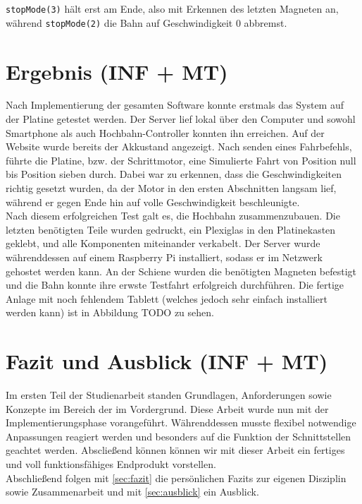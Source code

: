 \texttt{stopMode(3)} hält erst am Ende, also mit Erkennen des letzten Magneten an, während \texttt{stopMode(2)} die Bahn auf Geschwindigkeit 0 abbremst.

\chapter{Ergebnis (INF + MT)}
Nach Implementierung der gesamten Software konnte erstmals das System auf der Platine getestet werden. Der Server lief lokal über den Computer und sowohl Smartphone als auch Hochbahn-Controller konnten ihn erreichen. Auf der Website wurde bereits der Akkustand angezeigt. Nach senden eines Fahrbefehls, führte die Platine, bzw. der Schrittmotor, eine Simulierte Fahrt von Position null bis Position sieben durch. Dabei war zu erkennen, dass die Geschwindigkeiten richtig gesetzt wurden, da der Motor in den ersten Abschnitten langsam lief, während er gegen Ende hin auf volle Geschwindigkeit beschleunigte. \\
Nach diesem erfolgreichen Test galt es, die Hochbahn zusammenzubauen. Die letzten benötigten Teile wurden gedruckt, ein Plexiglas in den Platinekasten geklebt, und alle Komponenten miteinander verkabelt. Der Server wurde währenddessen auf einem Raspberry Pi installiert, sodass er im Netzwerk gehostet werden kann. An der Schiene wurden die benötigten Magneten befestigt und die Bahn konnte ihre erwste Testfahrt erfolgreich durchführen. Die fertige Anlage mit noch fehlendem Tablett (welches jedoch sehr einfach installiert werden kann) ist in Abbildung TODO zu sehen.



\chapter{Fazit und Ausblick (INF + MT)}
Im ersten Teil der Studienarbeit standen Grundlagen, Anforderungen sowie Konzepte im Bereich der im Vordergrund. Diese Arbeit wurde nun mit der Implementierungsphase vorangeführt. Währenddessen musste flexibel notwendige Anpassungen reagiert werden und besonders auf die Funktion der Schnittstellen geachtet werden. Abscließend können können wir mit dieser Arbeit ein fertiges und voll funktionsfähiges Endprodukt vorstellen. \\

Abschließend folgen mit \autoref{sec:fazit} die persönlichen Fazits zur eigenen Disziplin sowie Zusammenarbeit und mit \autoref{sec:ausblick} ein Ausblick. 


